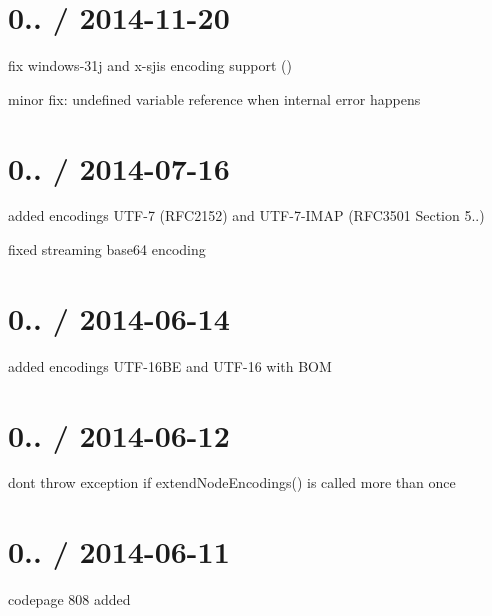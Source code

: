 \section*{0.. / 2014-\/11-\/20}


\begin{DoxyItemize}
\item fix windows-\/31j and x-\/sjis encoding support ()
\item minor fix\+: undefined variable reference when internal error happens
\end{DoxyItemize}

\section*{0.. / 2014-\/07-\/16}


\begin{DoxyItemize}
\item added encodings U\+T\+F-\/7 (R\+F\+C2152) and U\+T\+F-\/7-\/\+I\+M\+AP (R\+F\+C3501 Section 5..)
\item fixed streaming base64 encoding
\end{DoxyItemize}

\section*{0.. / 2014-\/06-\/14}


\begin{DoxyItemize}
\item added encodings U\+T\+F-\/16\+BE and U\+T\+F-\/16 with B\+OM
\end{DoxyItemize}

\section*{0.. / 2014-\/06-\/12}


\begin{DoxyItemize}
\item don\textquotesingle{}t throw exception if {\ttfamily extend\+Node\+Encodings()} is called more than once
\end{DoxyItemize}

\section*{0.. / 2014-\/06-\/11}


\begin{DoxyItemize}
\item codepage 808 added
\end{DoxyItemize}

